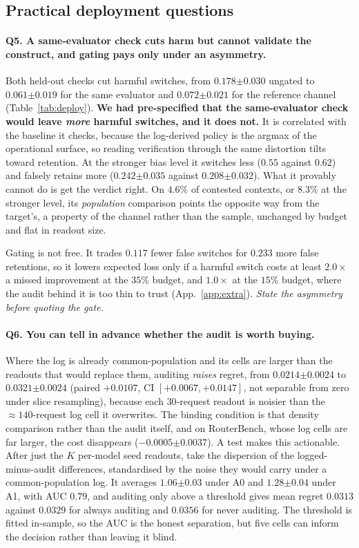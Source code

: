 \documentclass{article}
\theoremstyle{plain}
\theoremstyle{remark}
\newcommand{\se}[1]{{\scriptstyle\pm#1}}
\begin{document}
\subsection{Practical deployment questions}\label{sec:practical}

\paragraph{Q5. A same-evaluator check cuts harm but cannot validate the construct, and gating pays
only under an asymmetry.} Both held-out checks cut harmful switches, from $0.178\se{0.030}$ ungated
to $0.061\se{0.019}$ for the same evaluator and $0.072\se{0.021}$ for the reference channel
(Table~\ref{tab:deploy}). \textbf{We had pre-specified that the same-evaluator check would leave
\emph{more} harmful switches, and it does not.} It is correlated with the baseline it checks, because
the log-derived policy is the argmax of the operational surface, so reading verification through the
same distortion tilts toward retention. At the stronger bias level it switches less ($0.55$ against
$0.62$) and falsely retains more ($0.242\se{0.035}$ against $0.208\se{0.032}$). What it provably
cannot do is get the verdict right. On $4.6\%$ of contested contexts, or $8.3\%$ at the stronger
level, its \emph{population} comparison points the opposite way from the target's, a property of the
channel rather than the sample, unchanged by budget and flat in readout size.

Gating is not free. It trades $0.117$ fewer false switches for $0.233$ more false retentions, so it
lowers expected loss only if a harmful switch costs at least $2.0\times$ a missed improvement at the
$35\%$ budget, and $1.0\times$ at the $15\%$ budget, where the audit behind it is too thin to trust
(App.~\ref{app:extra}). \emph{State the asymmetry before quoting the gate.}

\paragraph{Q6. You can tell in advance whether the audit is worth buying.} Where the log is already
common-population and its cells are larger than the readouts that would replace them, auditing
\emph{raises} regret, from $0.0214\se{0.0024}$ to $0.0321\se{0.0024}$ (paired $+0.0107$, CI
$[+0.0067,+0.0147]$, not separable from zero under slice resampling), because each $30$-request
readout is noisier than the ${\approx}140$-request log cell it overwrites. The binding condition is
that density comparison rather than the audit itself, and on RouterBench, whose log cells are far
larger, the cost disappears ($-0.0005\se{0.0037}$). A test makes
this actionable. After just the $K$ per-model seed readouts, take the dispersion of the
logged-minus-audit differences, standardised by the noise they would carry under a common-population
log. It averages $1.06\se{0.03}$ under A0 and $1.28\se{0.04}$ under A1, with AUC
$0.79$, and auditing only above a threshold gives mean regret $0.0313$ against $0.0329$ for always
auditing and $0.0356$ for never auditing. The threshold is fitted in-sample, so the AUC is the honest
separation, but five cells can inform the decision rather than leaving it blind.
\end{document}
